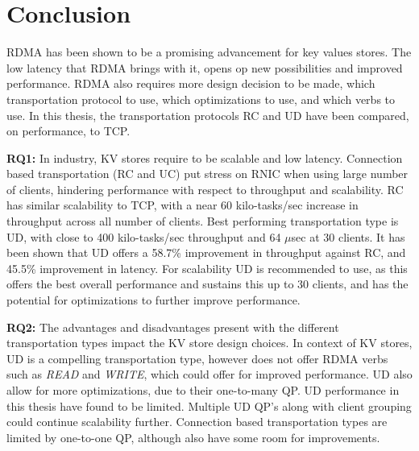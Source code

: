 
\chapter{Conclusion}\label{ch:conclusion} %



\ifpdf
    \graphicspath{{7/figures/PNG/}{7/figures/PDF/}{7/figures/}}
\else
    \graphicspath{{7/figures/EPS/}{7/figures/}}
\fi


%
RDMA has been shown to be a promising advancement for key values stores.
The low latency that RDMA brings with it, opens op new possibilities and improved performance.
RDMA also requires more design decision to be made, which transportation protocol to use, which optimizations to use, and which verbs to use.
In this thesis, the transportation protocols RC and UD have been compared, on performance, to TCP.

\textbf{RQ1:} In industry, KV stores require to be scalable and low latency.
Connection based transportation (RC and UC) put stress on RNIC when using large number of clients, hindering performance with respect to throughput and scalability.
RC has similar scalability to TCP, with a near 60 kilo-tasks/sec increase in throughput across all number of clients.
Best performing transportation type is UD, with close to 400 kilo-tasks/sec throughput and 64 $\mu$sec at 30 clients.
It has been shown that UD offers a 58.7\% improvement in throughput against RC, and 45.5\% improvement in latency.
For scalability UD is recommended to use, as this offers the best overall performance and sustains this up to 30 clients, and has the potential for optimizations to further improve performance.

\textbf{RQ2:} The advantages and disadvantages present with the different transportation types impact the KV store design choices.
In context of KV stores, UD is a compelling transportation type, however does not offer RDMA verbs such as \textit{READ} and \textit{WRITE}, which could offer for improved performance.
UD also allow for more optimizations, due to their one-to-many QP.
UD performance in this thesis have found to be limited.
Multiple UD QP's along with client grouping could continue scalability further.
Connection based transportation types are limited by one-to-one QP, although also have some room for improvements.


